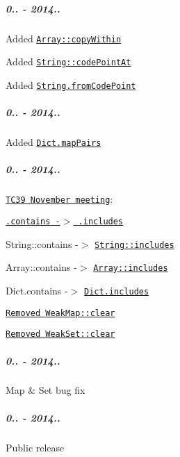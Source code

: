 \subparagraph*{0.. -\/ 2014..}


\begin{DoxyItemize}
\item Added \href{https://github.com/zloirock/core-js/#ecmascript-6-array}{\tt {\ttfamily Array\+::copy\+Within}}
\item Added \href{https://github.com/zloirock/core-js/#ecmascript-6-string}{\tt {\ttfamily String\+::code\+Point\+At}}
\item Added \href{https://github.com/zloirock/core-js/#ecmascript-6-string}{\tt {\ttfamily String.\+from\+Code\+Point}}
\end{DoxyItemize}

\subparagraph*{0.. -\/ 2014..}


\begin{DoxyItemize}
\item Added \href{https://github.com/zloirock/core-js/#dict}{\tt {\ttfamily Dict.\+map\+Pairs}}
\end{DoxyItemize}

\subparagraph*{0.. -\/ 2014..}


\begin{DoxyItemize}
\item \href{https://github.com/rwaldron/tc39-notes/tree/master/es6/2014-11}{\tt T\+C39 November meeting}\+:
\begin{DoxyItemize}
\item \href{https://github.com/rwaldron/tc39-notes/blob/master/es6/2014-11/nov-18.md#51--44-arrayprototypecontains-and-stringprototypecontains}{\tt {\ttfamily .contains} -\/$>$ {\ttfamily .includes}}
\begin{DoxyItemize}
\item {\ttfamily String\+::contains} -\/$>$ \href{https://github.com/zloirock/core-js/#ecmascript-6-string}{\tt {\ttfamily String\+::includes}}
\item {\ttfamily Array\+::contains} -\/$>$ \href{https://github.com/zloirock/core-js/#ecmascript-7-proposals}{\tt {\ttfamily Array\+::includes}}
\item {\ttfamily Dict.\+contains} -\/$>$ \href{https://github.com/zloirock/core-js/#dict}{\tt {\ttfamily Dict.\+includes}}
\end{DoxyItemize}
\item \href{https://github.com/rwaldron/tc39-notes/blob/master/es6/2014-11/nov-19.md#412-should-weakmapweakset-have-a-clear-method-markm}{\tt Removed {\ttfamily Weak\+Map\+::clear}}
\item \href{https://github.com/rwaldron/tc39-notes/blob/master/es6/2014-11/nov-19.md#412-should-weakmapweakset-have-a-clear-method-markm}{\tt Removed {\ttfamily Weak\+Set\+::clear}}
\end{DoxyItemize}
\end{DoxyItemize}

\subparagraph*{0.. -\/ 2014..}


\begin{DoxyItemize}
\item {\ttfamily Map} \& {\ttfamily Set} bug fix
\end{DoxyItemize}

\subparagraph*{0.. -\/ 2014..}


\begin{DoxyItemize}
\item Public release 
\end{DoxyItemize}
